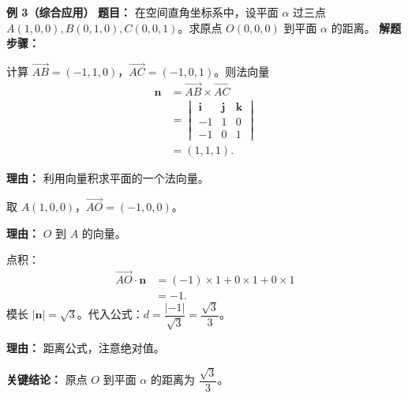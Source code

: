 \begin{examplebox}
	\medskip
	\textbf{\textcolor{CExample}{例 3（综合应用）}}
	\textbf{\textcolor{CExample}{题目：}}
	在空间直角坐标系中，设平面 $\alpha$ 过三点 $A(1,0,0), B(0,1,0), C(0,0,1)$。求原点 $O(0,0,0)$ 到平面 $\alpha$ 的距离。
	\textbf{\textcolor{CExample}{解题步骤：}}
	\begin{description}[style=nextline, leftmargin=2.8em, labelsep=0.5em, itemsep=0.45em]
		\item[\textbf{第一步（求法向量）：}]
			计算 $\overrightarrow{AB}=(-1,1,0)$，$\overrightarrow{AC}=(-1,0,1)$。则法向量
			\[
				\begin{aligned}
					\mathbf{n} &= \overrightarrow{AB}\times\overrightarrow{AC} \\ &=
					\begin{vmatrix}
						\mathbf{i} & \mathbf{j} & \mathbf{k}\\ -1 & 1 & 0\\ -1 & 0 & 1
				\end{vmatrix}
					\\ &= (1,1,1).
			\end{aligned}
			\]
			\par\textbf{理由：} 利用向量积求平面的一个法向量。
		\item[\textbf{第二步（选取平面上一点并计算 $\vec{AO}$）：}]
			取 $A(1,0,0)$，$\vec{AO}=(-1,0,0)$。
			\par\textbf{理由：} $O$ 到 $A$ 的向量。
		\item[\textbf{第三步（代入公式求距离）：}]
			点积：
			\[
				\begin{aligned}
					\vec{AO}\cdot\mathbf{n} &= (-1)\times1+0\times1+0\times1 \\&= -1.
			\end{aligned}
			\]
			模长 $|\mathbf{n}|=\sqrt{3}$。代入公式：$d=\dfrac{|-1|}{\sqrt{3}}=\dfrac{\sqrt{3}}{3}$。
			\par\textbf{理由：} 距离公式，注意绝对值。
	\end{description}
	\textbf{\textcolor{CExample}{关键结论：}}
	原点 $O$ 到平面 $\alpha$ 的距离为 \textbf{$\dfrac{\sqrt{3}}{3}$}。
\end{examplebox}
